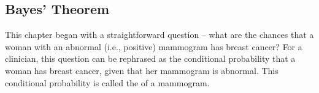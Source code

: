 \subsection{Bayes' Theorem}
\label{bayesTheoremSubsection}


This chapter began with a straightforward question -- what are the chances that a woman with an abnormal (i.e., positive) mammogram has breast cancer?  For a clinician, this question can be rephrased as the conditional probability  that a woman has breast cancer, given that her mammogram is abnormal. This conditional probability is called the  of a mammogram.  

